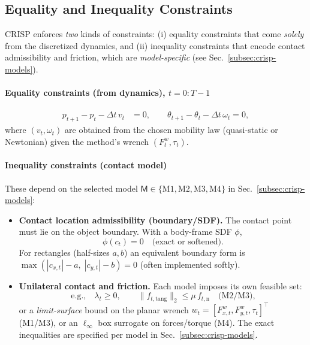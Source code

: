\documentclass[conference]{IEEEtran}
\begin{document}
\subsection{Equality and Inequality Constraints}
\label{subsec:crisp-constraints}

\noindent
CRISP enforces \emph{two} kinds of constraints:
(i) equality constraints that come \emph{solely} from the discretized dynamics, and
(ii) inequality constraints that encode contact admissibility and friction, which are
\emph{model-specific} (see Sec.~\ref{subsec:crisp-models}).

\paragraph{Equality constraints (from dynamics), $t=0{:}T-1$}
\[
\begin{aligned}
 p_{t+1}- p_t-\Delta t\,v_t &=  0, 
\qquad
\theta_{t+1}-\theta_t-\Delta t\,\omega_t = 0,
\end{aligned}
\]
where $(v_t,\omega_t)$ are obtained from the chosen mobility law
(quasi-static or Newtonian) given the method’s wrench $( F^w_t,\tau_t)$.

\paragraph{Inequality constraints (contact model)}
These depend on the selected model $\mathsf M \in \{\text{M1},\text{M2},\text{M3},\text{M4}\}$ in Sec.~\ref{subsec:crisp-models}:
\begin{itemize}
\item \textbf{Contact location admissibility (boundary/SDF).}
The contact point must lie on the object boundary. With a body-frame SDF $\phi$,
\[
\phi( c_t)=0 \quad \text{(exact or softened).}
\]
For rectangles (half-sizes $a,b$) an equivalent boundary form is
\(\max(|c_{x,t}|-a,\;|c_{y,t}|-b)=0\) (often implemented softly).

\item \textbf{Unilateral contact and friction.}
Each model imposes its own feasible set:
\[
\text{e.g.,}\quad
\lambda_t \ge 0,\qquad
\| f_{t,\mathrm{tang}}\|_2 \le \mu\,f_{t,\mathrm n}
\quad\text{(M2/M3),}
\]
or a \emph{limit-surface} bound on the planar wrench
\( w_t=[F^w_{x,t},F^w_{y,t},\tau_t]^\top\) (M1/M3),
or an $\ell_\infty$ box surrogate on forces/torque (M4).
The exact inequalities are specified per model in Sec.~\ref{subsec:crisp-models}.
\end{itemize}
\end{document}

